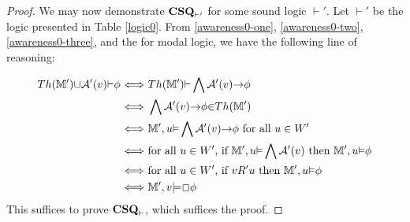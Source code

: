 \begin{proof}
  We may now demonstrate $\textup{{\bfseries{CSQ}}}_{\vdash'}$ for some
  sound logic $\vdash'$.  Let $\vdash'$ be the logic presented in
  Table \ref{logic0}.  From \eqref{awareness0-one}, \eqref{awareness0-two}, \eqref{awareness0-three},
  and the  for modal logic, we have the following
  line of reasoning:
  
  \begin{align*}
    Th({\mathbbm{M}}'){\cup}\mathcal{A}'(v){\vdash}{\phi}\ &
    {\Longleftrightarrow}\ Th({\mathbbm{M}}'){\vdash}\bigwedge\mathcal{A}'(v){\rightarrow}{\phi}\\
    &
    {\Longleftrightarrow}\ \bigwedge\mathcal{A}'(v){\rightarrow}{\phi}{\in}Th({\mathbbm{M}}')\\
    &
    {\Longleftrightarrow}\ {\mathbbm{M}}',u{\vDash}\bigwedge\mathcal{A}'(v){\rightarrow}{\phi}\text{
    for all $u \in W'$}\\
    & {\Longleftrightarrow}\ \text{for all $u \in W'$, if
    }{\mathbbm{M}}',u{\vDash}\bigwedge\mathcal{A}'(v)\text{ then
    }{\mathbbm{M}}',u{\vDash}{\phi}\\
    & {\Longleftrightarrow}\ \text{for all $u \in W'$, if }v R 'u \text{ then
    }{\mathbbm{M}}',u{\vDash}{\phi}\\
    & {\Longleftrightarrow}\ {\mathbbm{M}}',v{\models}\Box{\phi}
  \end{align*}
This suffices to prove $\textup{{\bfseries{CSQ}}}_{\vdash}$, which
suffices the proof.
\end{proof}
